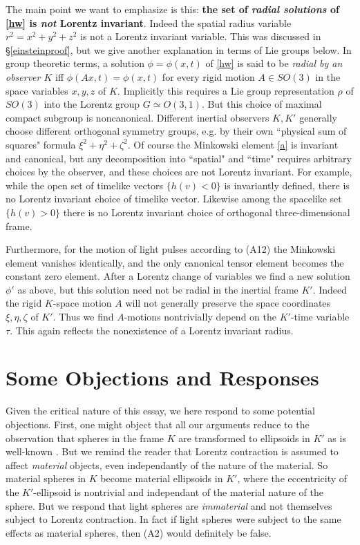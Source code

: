 \documentclass[12pt]{amsart}
\begin{document}
The main point we want to emphasize is this: \textbf{the set of \emph{radial solutions} of \eqref{hw} is \emph{not} Lorentz invariant}. Indeed the spatial radius variable $r^2=x^2+y^2+z^2$ is not a Lorentz invariant variable. This was discussed in \S\ref{einsteinproof}, but we give another explanation in terms of Lie groups below. In group theoretic terms, a solution $\phi=\phi(x,t)$ of \eqref{hw} is said to be \emph{radial by an observer $K$} iff $\phi(Ax,t)=\phi(x,t)$ for every rigid motion $A\in SO(3)$ in the space variables $x,y,z$ of $K$. Implicitly this requires a Lie group representation $\rho$ of $SO(3)$ into the Lorentz group $G\simeq O(3,1)$. But this choice of maximal compact subgroup is noncanonical. Different inertial observers $K, K'$ generally choose different orthogonal symmetry groups, e.g. by their own ``physical sum of squares" formula $\xi^2+\eta^2+\zeta^2$. Of course the Minkowski element \eqref{a} is invariant and canonical, but any decomposition into ``spatial" and ``time" requires arbitrary choices by the observer, and these choices are not Lorentz invariant. For example, while the open set of timelike vectors $\{h(v)<0\}$ is invariantly defined, there is no Lorentz invariant choice of timelike vector. Likewise among the spacelike set $\{h(v)>0\}$ there is no Lorentz invariant choice of orthogonal three-dimensional frame. 

Furthermore, for the motion of light pulses according to (A12) the Minkowski element vanishes identically, and the only canonical tensor element becomes the constant zero element. After a Lorentz change of variables we find a new solution $\phi'$ as above, but this solution need not be radial in the inertial frame $K'$. Indeed the rigid $K$-space motion $A$ will not generally preserve the space coordinates $\xi, \eta, \zeta$ of $K'$. Thus we find $A$-motions nontrivially depend on the $K'$-time variable $\tau$. This again reflects the nonexistence of a Lorentz invariant radius.








\section{Some Objections and Responses}\label{objections}
Given the critical nature of this essay, we here respond to some potential objections. First, one might object that all our arguments reduce to the observation that spheres in the frame $K$ are transformed to ellipsoids in $K'$ as is well-known \cite[\S 4]{einstein1905electrodynamics}. But we remind the reader that Lorentz contraction is assumed to affect \emph{material} objects, even independantly of the nature of the material. So material spheres in $K$ become material ellipsoids in $K'$, where the eccentricity of the $K'$-ellipsoid is nontrivial and independant of the material nature of the sphere. But we respond that light spheres are \emph{immaterial} and not themselves subject to Lorentz contraction. In fact if light spheres were subject to the same effects as material spheres, then (A2) would definitely be false.
\end{document}

